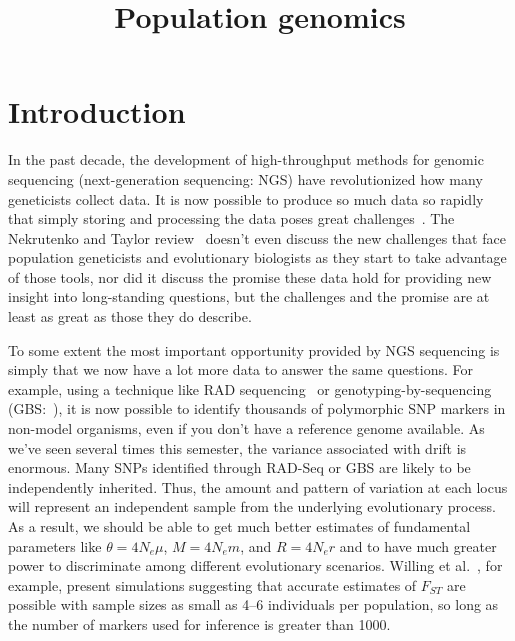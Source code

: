 \documentclass[12pt]{article}
\title{Population genomics}
\begin{document}
\maketitle

\thispagestyle{first}

\section*{Introduction}

In the past decade, the development of high-throughput methods for
genomic sequencing (next-generation sequencing: NGS) have
revolutionized how many geneticists collect data. It is now possible
to produce so much data so rapidly that simply storing and processing
the data poses great challenges~\cite{Nekrutenko-Taylor-2012}. The
Nekrutenko and Taylor review~\cite{Nekrutenko-Taylor-2012} doesn't
even discuss the new challenges that face population geneticists and
evolutionary biologists as they start to take advantage of those
tools, nor did it discuss the promise these data hold for providing
new insight into long-standing questions, but the challenges and the
promise are at least as great as those they do
describe.

To some extent the most important opportunity provided by NGS
sequencing is simply that we now have a lot more data to answer the
same questions. For example, using a technique like RAD
sequencing~\cite{Baird-etal-2008} or genotyping-by-sequencing
(GBS:~\cite{Elshire-etal-2011}), it is now possible to identify
thousands of polymorphic SNP markers in non-model organisms, even if
you don't have a reference genome available. As we've seen several
times this semester, the variance associated with drift is
enormous. Many SNPs identified through RAD-Seq or GBS are likely to be
independently inherited. Thus, the amount and pattern of variation at
each locus will represent an independent sample from the underlying
evolutionary process. As a result, we should be able to get much
better estimates of fundamental parameters like $\theta=4N_e\mu$,
$M=4N_em$, and $R=4N_er$ and to have much greater power to
discriminate among different evolutionary scenarios. Willing et
al.~\cite{Willing-etal-2012}, for example, present simulations
suggesting that accurate estimates of $F_{ST}$ are possible with
sample sizes as small as 4--6 individuals per population, so long as
the number of markers used for inference is greater than
1000.
\end{document}
